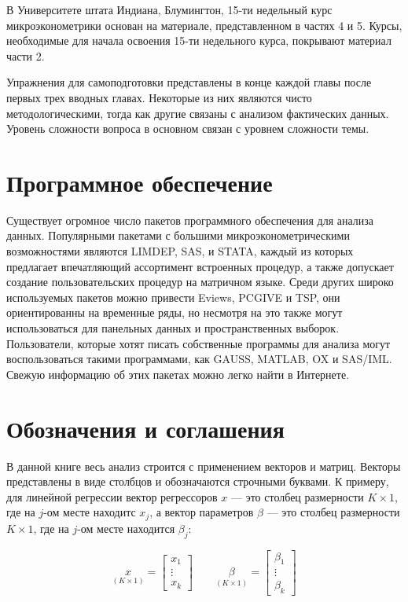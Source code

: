 	
	
В Университете штата Индиана, Блумингтон, 15-ти недельный курс микроэконометрики основан на материале, представленном в частях 4 и 5. Курсы, необходимые для начала  освоения 15-ти недельного курса, покрывают материал части 2.

Упражнения для самоподготовки представлены в конце каждой главы после первых трех вводных главах. Некоторые из них являются чисто методологическими, тогда как другие связаны с анализом фактических данных. Уровень сложности вопроса в основном связан с уровнем сложности темы.
	
\section{Программное обеспечение}

Существует огромное число пакетов программного обеспечения для анализа данных. Популярными пакетами с большими микроэконометрическими возможностями являются LIMDEP, SAS, и STATA, каждый из которых предлагает впечатляющий ассортимент встроенных процедур, а также допускает создание пользовательских процедур на матричном языке. Среди других широко используемых пакетов можно привести Eviews, PCGIVE и TSP,  они ориентированны на временные ряды, но несмотря на это  также могут использоваться для панельных данных и пространственных выборок. Пользователи, которые хотят писать собственные программы для анализа могут воспользоваться такими программами, как GAUSS, MATLAB, OX и SAS/IML. Свежую информацию об этих пакетах можно легко найти в Интернете.

\section{Обозначения и соглашения}

В данной книге весь анализ строится с применением векторов и матриц.
Векторы представлены в виде столбцов и обозначаются строчными буквами. К примеру, для линейной регрессии вектор регрессоров $ x $ --- это столбец размерности $ K \times 1 $, где на $j$-ом месте находитс $ x_{j} $, а вектор параметров $\beta$ --- это столбец размерности $ K \times 1 $, где на $j$-ом месте находится $ \beta_{j} $:

\[
\underset{(K\times1)}{x} = \begin{bmatrix} x_{1} \\ \vdots \\ x_{k} \end{bmatrix} \qquad 
\underset{(K\times1)}{\beta} = \begin{bmatrix} \beta_{1} \\ \vdots \\ \beta_{k} \end{bmatrix}
\]
	
